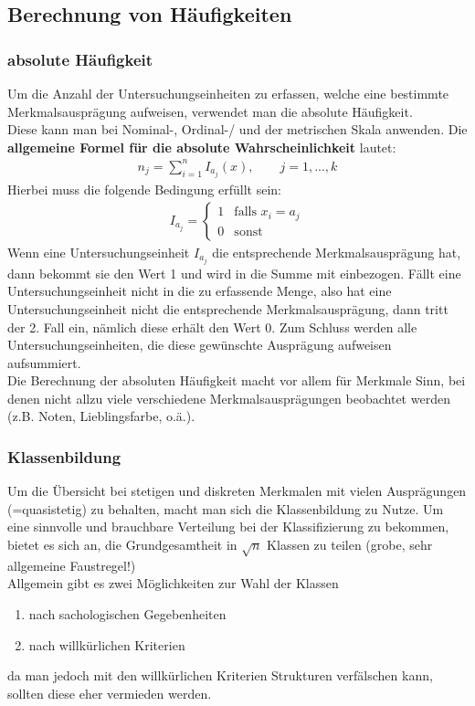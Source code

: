 \documentclass[a4paper]{article}
\begin{document}
\subsection{Berechnung von Häufigkeiten}

\subsubsection{absolute Häufigkeit}\label{sec:abs-hkeit}
Um die Anzahl der Untersuchungseinheiten zu erfassen, welche eine bestimmte Merkmalsausprägung aufweisen, verwendet man die absolute Häufigkeit.\\
Diese kann man bei Nominal-, Ordinal-/ und der metrischen Skala anwenden.
Die \textbf{allgemeine Formel für die absolute Wahrscheinlichkeit} lautet:
\begin{align*}
    n_j=\sum_{i=1}^n I_{a_j} (x),\qquad  j=1,...,k
\end{align*}
Hierbei muss die folgende Bedingung erfüllt sein:
\begin{align*}
    I_{a_j}=\begin{cases}
			1 & \text{falls } x_i = a_j \\
            0 & \text{sonst}
		 \end{cases}
\end{align*}
Wenn eine Untersuchungseinheit $I_{a_j}$ die entsprechende Merkmalsausprägung hat, dann bekommt sie den Wert 1 und wird in die Summe mit einbezogen. Fällt eine Untersuchungseinheit nicht in die zu erfassende Menge, also hat eine Untersuchungseinheit nicht die entsprechende Merkmalsausprägung, dann tritt der 2. Fall ein, nämlich diese erhält den Wert 0. Zum Schluss werden alle Untersuchungseinheiten, die diese gewünschte Ausprägung aufweisen aufsummiert.\\
Die Berechnung der absoluten Häufigkeit macht vor allem für Merkmale Sinn, bei denen nicht allzu viele verschiedene Merkmalsausprägungen beobachtet werden (z.B. Noten, Lieblingsfarbe, o.ä.).


\subsubsection{Klassenbildung}\label{sec:klassenbildung}
Um die Übersicht bei stetigen und diskreten Merkmalen mit vielen Ausprägungen (=quasistetig) zu behalten, macht man sich die Klassenbildung zu Nutze.
Um eine sinnvolle und brauchbare Verteilung bei der Klassifizierung zu bekommen, bietet es sich an, die Grundgesamtheit in $\sqrt{n}$ Klassen zu teilen (grobe, sehr allgemeine Faustregel!)\\
Allgemein gibt es zwei Möglichkeiten zur Wahl der Klassen
\begin{enumerate}
    \item nach sachologischen Gegebenheiten
    \item nach willkürlichen Kriterien
\end{enumerate}
da man jedoch mit den willkürlichen Kriterien Strukturen verfälschen kann, sollten diese eher vermieden werden.
\end{document}
